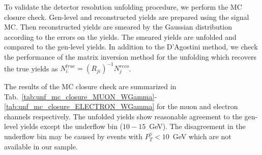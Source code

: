 To validate the detector resolution unfolding procedure, we perform the MC closure check. Gen-level and reconstructed yields are prepared using the signal MC. Then reconstructed yields are smeared by the Gaussian distribution according to the errors on the yields. The smeared yields are unfolded and compared to the gen-level yields. In addition to the D'Agostini method, we check the performance of the matrix inversion method for the unfolding which recovers the true yields as $N^{true}_i = (R_{ji})^{-1} N^{reco}_j$. 

The results of the MC closure check are summarized in Tab.~\ref{tab:unf_mc_closure_MUON_WGamma}-\ref{tab:unf_mc_closure_ELECTRON_WGamma} for the muon and electron channels respectively. The unfolded yields show reasonable agreement to the gen-level yields except the underflow bin ($10-15$~GeV). The disagreement in the underflow bin may be caused by events with $P_T^{\gamma}<10$~GeV which are not available in our sample. 



